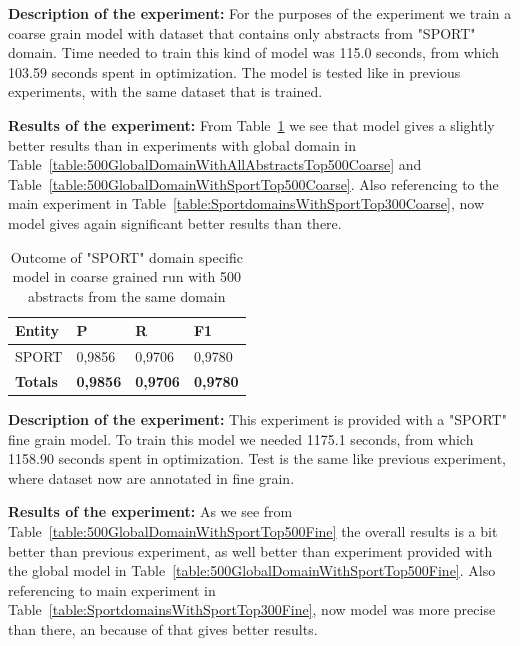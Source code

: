 \documentclass[thesis=M,english]{FITthesis}[2018/05/30]
\begin{document}

	\textbf{Description of the experiment:} For the purposes of the experiment we train a coarse grain model with dataset that contains only abstracts from "SPORT" domain. Time needed to train this kind of model was 115.0 seconds, from which 103.59 seconds spent in optimization. The model is tested like in previous experiments, with the same dataset that is trained.

	\textbf{Results of the experiment:} From Table~\ref{table:500SportDomainWithSportTop500Coarse} we see that model gives a slightly better results than in experiments with global domain in Table~\ref{table:500GlobalDomainWithAllAbstractsTop500Coarse} and Table~\ref{table:500GlobalDomainWithSportTop500Coarse}. Also referencing to the main experiment in Table~\ref{table:SportdomainsWithSportTop300Coarse}, now model gives again significant better results than there.

	\begin{table}[H]\centering
		\begin{tabular}{|l|l|l|l|}
			\hline {\textbf{Entity}} & {\textbf{P}} & {\textbf{R}} & {\textbf{F1}}\\\hline
				SPORT & 0,9856 & 0,9706 & 0,9780\\\hline
				\textbf{Totals} & \textbf{0,9856} & \textbf{0,9706} & \textbf{0,9780}\\\hline
		\end{tabular}
		\caption{Outcome of "SPORT" domain specific model in coarse grained run with 500 abstracts from the same domain \label{table:500SportDomainWithSportTop500Coarse}}
	\end{table}

	\textbf{Description of the experiment:} This experiment is provided with a "SPORT" fine grain model. To train this model we needed 1175.1 seconds, from which 1158.90 seconds spent in optimization. Test is the same like previous experiment, where dataset now are annotated in fine grain.

	\textbf{Results of the experiment:} As we see from Table~\ref{table:500GlobalDomainWithSportTop500Fine} the overall results is a bit better than previous experiment, as well better than experiment provided with the global model in Table~\ref{table:500GlobalDomainWithSportTop500Fine}. Also referencing to main experiment in Table~\ref{table:SportdomainsWithSportTop300Fine}, now model was more precise than there, an because of that gives better results.
\end{document}
